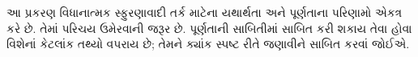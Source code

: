 \documentclass[../../../include/open-logic-chapter]{subfiles}
\begin{document}

\begin{editorial}
  આ પ્રકરણ વિધાનાત્મક સ્ફુરણાવાદી તર્ક માટેના યથાર્થતા
  અને પૂર્ણતાના પરિણામો એકત્ર કરે છે. તેમાં પરિચય ઉમેરવાની
  જરૂર છે. પૂર્ણતાની સાબિતીમાં સાબિત કરી શકાય તેવા હોવા
  વિશેનાં કેટલાંક તથ્યો વપરાય છે; તેમને ક્યાંક સ્પષ્ટ રીતે
  જણાવીને સાબિત કરવાં જોઈએ.
\end{editorial}


\OLEndChapterHook
\end{document}
